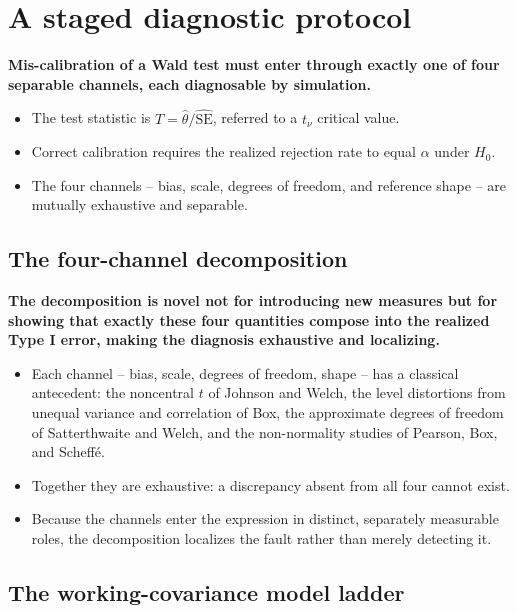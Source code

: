 \documentclass[
  11pt,
]{article}
\begin{document}
\section{A staged diagnostic protocol}\label{a-staged-diagnostic-protocol}

\textbf{Mis-calibration of a Wald test must enter through exactly one of four separable channels, each diagnosable by simulation.}

\begin{itemize}\setlength{\itemsep}{2pt}\setlength{\parskip}{0pt}
\item The test statistic is $T = \hat\theta / \widehat{\mathrm{SE}}$, referred to a $t_\nu$ critical value.
\item Correct calibration requires the realized rejection rate to equal $\alpha$ under $H_0$.
\item The four channels -- bias, scale, degrees of freedom, and reference shape -- are mutually exhaustive and separable.
\end{itemize}

\subsection{The four-channel decomposition}\label{the-four-channel-decomposition}

\textbf{The decomposition is novel not for introducing new measures but for showing that exactly these four quantities compose into the realized Type I error, making the diagnosis exhaustive and localizing.}

\begin{itemize}\setlength{\itemsep}{2pt}\setlength{\parskip}{0pt}
\item Each channel -- bias, scale, degrees of freedom, shape -- has a classical antecedent: the noncentral $t$ of Johnson and Welch, the level distortions from unequal variance and correlation of Box, the approximate degrees of freedom of Satterthwaite and Welch, and the non-normality studies of Pearson, Box, and Scheff\'e.
\item Together they are exhaustive: a discrepancy absent from all four cannot exist.
\item Because the channels enter the expression in distinct, separately measurable roles, the decomposition localizes the fault rather than merely detecting it.
\end{itemize}

\subsection{The working-covariance model ladder}\label{the-working-covariance-model-ladder}
\end{document}
